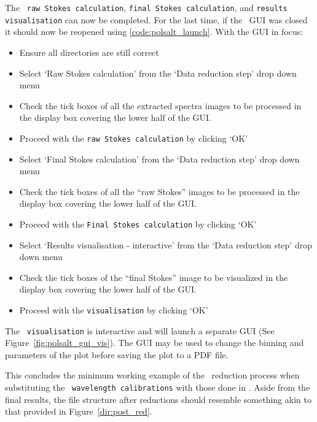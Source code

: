 The \polsalt\ \texttt{raw Stokes calculation}, \texttt{final Stokes calculation}, and \texttt{results visualisation} can now be completed. For the last time, if the \polsalt\ \gls{GUI} was closed it should now be reopened using \ref{code:polsalt_launch}. With the \gls{GUI} in focus:
\begin{itemize}
    \item Ensure all directories are still correct
    \item Select `Raw Stokes calculation' from the `Data reduction step' drop down menu
    \item Check the tick boxes of all the extracted spectra images to be processed in the display box covering the lower half of the \gls{GUI}.
    \item Proceed with the \texttt{raw Stokes calculation} by clicking `OK'
    \item Select `Final Stokes calculation' from the `Data reduction step' drop down menu
    \item Check the tick boxes of all the ``raw Stokes'' images to be processed in the display box covering the lower half of the \gls{GUI}.
    \item Proceed with the \texttt{Final Stokes calculation} by clicking `OK'
    \item Select `Results visualisation - interactive' from the `Data reduction step' drop down menu
    \item Check the tick boxes of the ``final Stokes'' image to be visualized in the display box covering the lower half of the \gls{GUI}.
    \item Proceed with the \texttt{visualisation} by clicking `OK'
\end{itemize}

The \polsalt\ \texttt{visualisation} is interactive and will launch a separate \gls{GUI} (See Figure~\ref{fig:polsalt_gui_vis}). The \gls{GUI} may be used to change the binning and parameters of the plot before saving the plot to a PDF file.

This concludes the minimum working example of the \polsalt\ reduction process when substituting the \polsalt\ \texttt{wavelength calibrations} with those done in \iraf. Aside from the final results, the file structure after reductions should resemble something akin to that provided in Figure~\ref{dir:post_red}.

